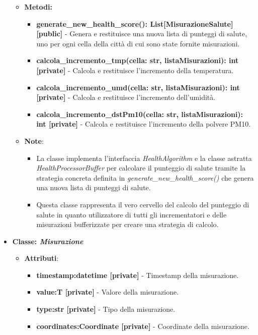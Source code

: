 \begin{itemize}
\begin{itemize}
\begin{itemize}
    \end{itemize}
    \item \textbf{Metodi: }
    \begin{itemize}
        \item \textbf{generate\_new\_health\_score(): List[MisurazioneSalute] [public]} - Genera e restituisce una nuova lista di punteggi di salute, uno per ogni cella della città di cui sono state fornite misurazioni.
        \item \textbf{calcola\_incremento\_tmp(cella: str, listaMisurazioni): int [private]} - Calcola e restituisce l'incremento della temperatura.
        \item \textbf{calcola\_incremento\_umd(cella: str, listaMisurazioni): int [private]} - Calcola e restituisce l'incremento dell'umidità.
        \item \textbf{calcola\_incremento\_dstPm10(cella: str, listaMisurazioni): int [private]} - Calcola e restituisce l'incremento della polvere PM10.
    \end{itemize}
    \item\textbf{Note}:
        \begin{itemize}
            \item La classe implementa l'interfaccia \textit{HealthAlgorithm} e la classe astratta \textit{HealthProcessorBuffer} per calcolare il punteggio di salute tramite la strategia concreta definita in \textit{generate\_new\_health\_score()} che genera una nuova lista di punteggi di salute.
            \item Questa classe rappresenta il vero cervello del calcolo del punteggio di salute in quanto utilizzatore di tutti gli incrementatori e delle misurazioni bufferizzate per creare una strategia di calcolo.
        \end{itemize}
    \end{itemize}
    \item\textbf{Classe: \textit{Misurazione}}
    \begin{itemize}
        \item   \textbf{Attributi}: 
    \begin{itemize}
        \item \textbf{timestamp:datetime [private]} - Timestamp della misurazione.
        \item \textbf{value:T [private]} - Valore della misurazione.
        \item \textbf{type:str [private]} - Tipo della misurazione.
        \item \textbf{coordinates:Coordinate [private]} - Coordinate della misurazione.

\end{itemize}
\end{itemize}
\end{itemize}
